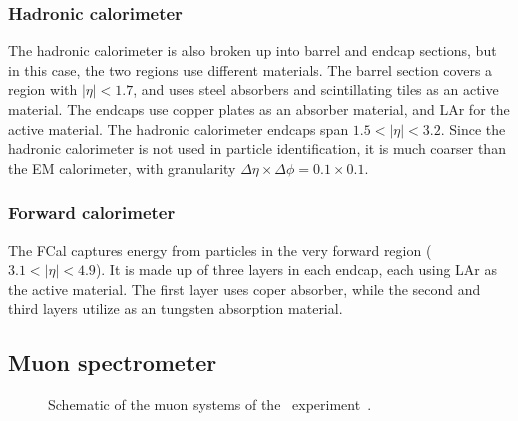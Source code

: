 \FloatBarrier
\subsubsection{Hadronic calorimeter} 
\label{sec:hcal}

The hadronic calorimeter is also broken up into barrel and endcap sections, but
in this case, the two regions use different materials.
The barrel section covers a region with $|\eta| < 1.7$, and uses steel
absorbers and scintillating tiles as an active material.
The endcaps use copper plates as an absorber material, and LAr for the active
material.
The hadronic calorimeter endcaps span $1.5 < |\eta| < 3.2$.
Since the hadronic calorimeter is not used in particle identification, it is
much coarser than the EM calorimeter, with granularity
$\Delta\eta \times \Delta\phi = 0.1 \times 0.1$.

\FloatBarrier
\subsubsection{Forward calorimeter} 
\label{sec:fcal}

The FCal captures energy from particles in the very forward region
($3.1 < |\eta| < 4.9$).
It is made up of three layers in each endcap, each using LAr as the active
material.
The first layer uses coper absorber, while the second and third layers utilize
as an tungsten absorption material.

\FloatBarrier
\subsection{Muon spectrometer} 
\label{sec:ms}

\begin{figure}[ht]
  \caption{
    Schematic of the muon systems of the
    \atlas\ experiment~\cite{Pequenao:1095929}.
  }
  \label{fig:ms_cartoon}
\end{figure}

